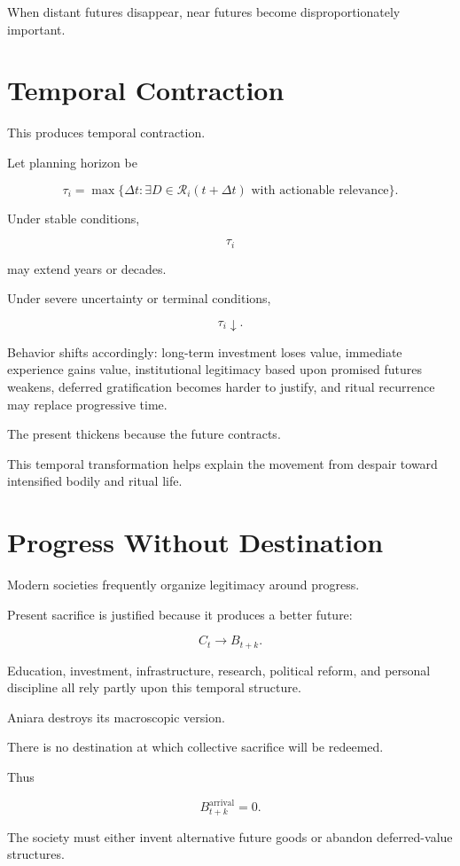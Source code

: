 \documentclass[11pt,oneside]{book}
\theoremstyle{definition}
\theoremstyle{remark}
\newcommand{\R}{\mathcal{R}}
\begin{document}
When distant futures disappear, near futures become disproportionately important.

\section{Temporal Contraction}

This produces temporal contraction.

Let planning horizon be

\[
\tau_i
=
\max
\{
\Delta t:
\exists D\in\R_i(t+\Delta t)
\text{ with actionable relevance}
\}.
\]

Under stable conditions,

\[
\tau_i
\]

may extend years or decades.

Under severe uncertainty or terminal conditions,

\[
\tau_i\downarrow.
\]

Behavior shifts accordingly: long-term investment loses value, immediate experience gains value, institutional legitimacy based upon promised futures weakens, deferred gratification becomes harder to justify, and ritual recurrence may replace progressive time.

The present thickens because the future contracts.

This temporal transformation helps explain the movement from despair toward intensified bodily and ritual life.

\section{Progress Without Destination}

Modern societies frequently organize legitimacy around progress.

Present sacrifice is justified because it produces a better future:

\[
C_t
\rightarrow
B_{t+k}.
\]

Education, investment, infrastructure, research, political reform, and personal discipline all rely partly upon this temporal structure.

Aniara destroys its macroscopic version.

There is no destination at which collective sacrifice will be redeemed.

Thus

\[
B_{t+k}^{\mathrm{arrival}}
=
0.
\]

The society must either invent alternative future goods or abandon deferred-value structures.
\end{document}
